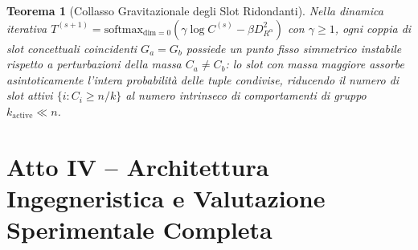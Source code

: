 \documentclass[10pt,a4paper]{article}
\newtheorem{theorem}{Teorema}
\begin{document}
\begin{theorem}[Collasso Gravitazionale degli Slot Ridondanti]
\label{thm:collapse}
Nella dinamica iterativa $T^{(s+1)} = \text{softmax}_{\text{dim}=0}(\gamma \log C^{(s)} - \beta D^2_{R^\alpha})$ con $\gamma \ge 1$, ogni coppia di slot concettuali coincidenti $G_a = G_b$ possiede un punto fisso simmetrico instabile rispetto a perturbazioni della massa $C_a \neq C_b$: lo slot con massa maggiore assorbe asintoticamente l'intera probabilit\`a delle tuple condivise, riducendo il numero di slot attivi $\{i : C_i \ge n/k\}$ al numero intrinseco di comportamenti di gruppo $k_{\text{active}} \ll n$.
\end{theorem}

\section{Atto IV -- Architettura Ingegneristica e Valutazione Sperimentale Completa}
\end{document}

